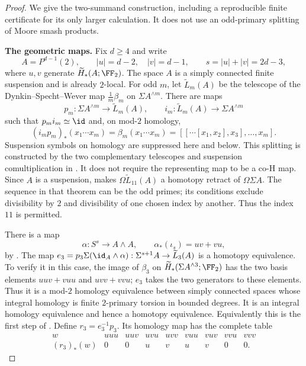 \begin{proof}
We give the two-summand construction, including a reproducible
finite certificate for its only larger calculation. It does not
use an odd-primary splitting of Moore smash products.

\medskip\noindent
\textbf{The geometric maps.}
Fix $d\geq4$ and write
\[
 A=P^{d-1}(2),\qquad |u|=d-2,\quad |v|=d-1,\qquad
 s=|u|+|v|=2d-3,
\]
where $u,v$ generate $\widetilde H_*(A;\FF_2)$.
The space $A$ is a simply connected finite suspension and is
already $2$-local. For odd $m$, let
$\widetilde L_m(A)$ be the telescope of the
Dynkin--Specht--Wever map $\frac1m\beta_m$ on
$\Sigma A^{\wedge m}$. There are maps
\[
 p_m:\Sigma A^{\wedge m}\longrightarrow\widetilde L_m(A),
 \qquad
 i_m:\widetilde L_m(A)\longrightarrow\Sigma A^{\wedge m}
\]
such that $p_mi_m\simeq\id$ and, on mod-$2$ homology,
\[
 (i_mp_m)_*(x_1\cdots x_m)
       =\beta_m(x_1\cdots x_m)
       =[[\cdots[x_1,x_2],x_3],\ldots,x_m].
 \tag{D.1.8.2}
\]
Suspension symbols on homology are suppressed here and below.
This splitting is constructed by the two complementary
telescopes and suspension comultiplication in
\cite[Section~2, pp.~3248--3249]{I_ChenWu2013}.
It does not require the representing map to be a co-H map.
Since $A$ is a suspension, \cite[Theorem~1.6]{I_Wu1998}
makes $\Omega\widetilde L_{11}(A)$ a homotopy retract of
$\Omega\Sigma A$. The sequence in that theorem can be the odd
primes; its conditions exclude divisibility by $2$ and divisibility
of one chosen index by another. Thus the index $11$ is permitted.

There is a map
\[
       \alpha:S^s\longrightarrow A\wedge A,
       \qquad \alpha_*(\iota_s)=uv+vu,
 \tag{D.1.8.3}
\]
by \cite[Proposition~2.1, pp.~3249--3250]{I_ChenWu2013}.
The map
$e_3=p_3\Sigma(\id_A\wedge\alpha):
\Sigma^{s+1}A\to\widetilde L_3(A)$
is a homotopy equivalence. To verify it in this case, the image
of $\beta_3$ on $\widetilde H_*(\Sigma A^{\wedge3};\FF_2)$
has the two basis elements $uuv+vuu$ and $uvv+vvu$;
$e_3$ takes the two generators to these elements. Thus it is a
mod-$2$ homology equivalence between simply connected spaces
whose integral homology is finite $2$-primary torsion in bounded
degrees. It is an integral homology equivalence and hence a
homotopy equivalence. Equivalently this is the first step of
\cite[proof of Proposition~3.1, p.~3251]{I_ChenWu2013}.
Define $r_3=e_3^{-1}p_3$. Its homology map has the complete table
\[
\begin{array}{c|cccccccc}
 w&uuu&uuv&uvu&uvv&vuu&vuv&vvu&vvv\\ \hline
 (r_3)_*(w)&0&0&u&v&u&v&0&0.
\end{array}                                      \tag{D.1.8.4}
\]


\end{proof}
